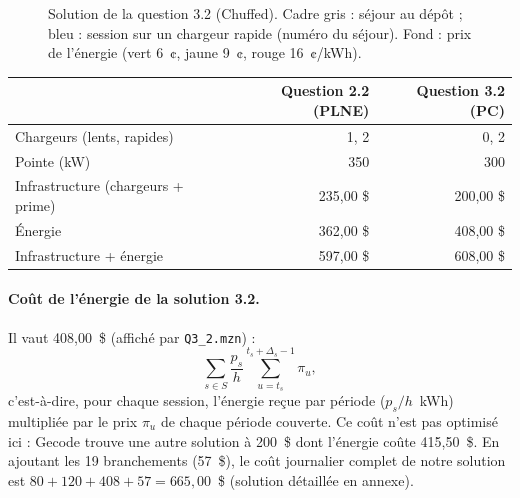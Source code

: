 \documentclass{article}
\begin{document}
\begin{figure}[h]
\centering
{}
\caption{Solution de la question 3.2 (Chuffed). Cadre gris : séjour au dépôt ; bleu : session sur un chargeur rapide (numéro du séjour). Fond : prix de l'énergie (vert 6~¢, jaune 9~¢, rouge 16~¢/kWh).}
\end{figure}

\begin{center}
\begin{tabular}{lrr}
\hline
 & Question 2.2 (PLNE) & Question 3.2 (PC) \\
\hline
Chargeurs (lents, rapides) & 1, 2 & 0, 2 \\
Pointe (kW) & 350 & 300 \\
Infrastructure (chargeurs + prime) & 235,00 \$ & 200,00 \$ \\
Énergie & 362,00 \$ & 408,00 \$ \\
Infrastructure + énergie & 597,00 \$ & 608,00 \$ \\
\hline
\end{tabular}
\end{center}

\paragraph{Coût de l'énergie de la solution 3.2.} Il vaut 408,00~\$ (affiché par \texttt{Q3\_2.mzn}) :
\[ \sum_{s \in S} \frac{p_s}{h} \sum_{u=t_s}^{t_s+\Delta_s-1} \pi_u, \]
c'est-à-dire, pour chaque session, l'énergie reçue par période ($p_s/h$~kWh) multipliée par le prix $\pi_u$ de chaque période couverte. Ce coût n'est pas optimisé ici : Gecode trouve une autre solution à 200~\$ dont l'énergie coûte 415,50~\$. En ajoutant les 19 branchements (57~\$), le coût journalier complet de notre solution est $80 + 120 + 408 + 57 = 665{,}00$~\$ (solution détaillée en annexe).
\end{document}
